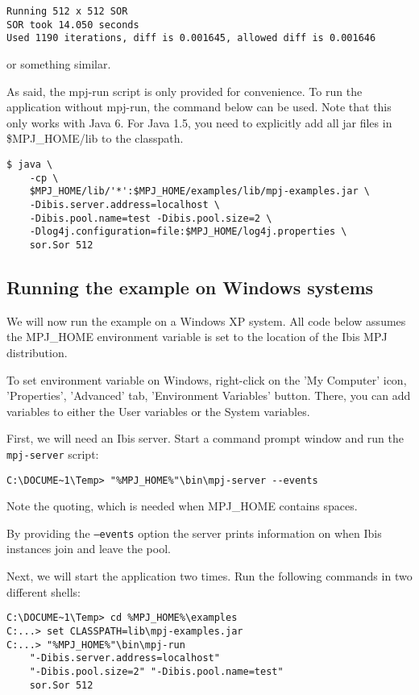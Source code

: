 \documentclass[a4paper,10pt]{article}
\begin{document}
\noindent
{\small
\begin{verbatim}
Running 512 x 512 SOR
SOR took 14.050 seconds
Used 1190 iterations, diff is 0.001645, allowed diff is 0.001646
\end{verbatim}
}
\noindent

or something similar.

As said, the mpj-run script is only provided for convenience. To run
the application without mpj-run, the command below can be used.
Note that this only works with Java 6. For Java 1.5, you need to
explicitly add all jar files in \$MPJ\_HOME/lib to the classpath.

\noindent
{\small
\begin{verbatim}
$ java \
    -cp \
    $MPJ_HOME/lib/'*':$MPJ_HOME/examples/lib/mpj-examples.jar \
    -Dibis.server.address=localhost \
    -Dibis.pool.name=test -Dibis.pool.size=2 \
    -Dlog4j.configuration=file:$MPJ_HOME/log4j.properties \
    sor.Sor 512
\end{verbatim}
}
\noindent

\subsection{Running the example on Windows systems}

We will now run the example on a Windows XP system.
All code below assumes the MPJ\_HOME
environment variable is set to the location of the Ibis MPJ distribution.

To set environment variable on Windows, right-click on the 'My Computer' icon,
'Properties', 'Advanced' tab, 'Environment Variables' button. There, you
can add variables to either the User variables or the System variables.

First, we will need an Ibis server. Start a command prompt window and
run the \texttt{mpj-server} script:
\noindent
{\small
\begin{verbatim}
C:\DOCUME~1\Temp> "%MPJ_HOME%"\bin\mpj-server --events
\end{verbatim}
}
\noindent

Note the quoting, which is needed when MPJ\_HOME contains spaces.

By providing the \texttt{--events} option the server
prints information on when Ibis instances join and leave the pool.

Next, we will start the application two times.
Run the following commands in two different shells:

\noindent
{\small
\begin{verbatim}
C:\DOCUME~1\Temp> cd %MPJ_HOME%\examples
C:...> set CLASSPATH=lib\mpj-examples.jar
C:...> "%MPJ_HOME%"\bin\mpj-run
    "-Dibis.server.address=localhost"
    "-Dibis.pool.size=2" "-Dibis.pool.name=test"
    sor.Sor 512
\end{verbatim}
}
\noindent
\end{document}

